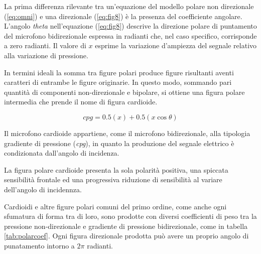 La prima differenza rilevante tra un'equazione del modello polare non
direzionale (\ref{eq:omni}) e una direzionale (\ref{eq:fig8}) è la
presenza del coefficiente angolare. L'angolo \emph{theta} nell'equazione
(\ref{eq:fig8}) descrive la direzione polare di puntamento del microfono bidirezionale
espressa in radianti che, nel caso specifico, corrisponde a zero radianti. Il valore di
$x$ esprime la variazione d'ampiezza del segnale relativo alla variazione di pressione.

In termini ideali la somma tra figure polari produce figure risultanti aventi caratteri
di entrambe le figure originarie. In questo modo, sommando pari quantità di componenti
non-direzionale e bipolare, si ottiene una figura polare intermedia che prende il
nome di figura cardioide.

\begin{equation}
cpg = 0.5(x) + 0.5(x\cos\theta)
\label{eq:cardioid}
\end{equation}

Il microfono cardioide appartiene, come il microfono bidirezionale, alla tipologia
gradiente di pressione (\emph{cpg}), in quanto la produzione del segnale elettrico è condizionata
dall'angolo di incidenza.

La figura polare cardioide presenta la sola polarità positiva, una spiccata
sensibilità frontale ed una progressiva riduzione di sensibilità al variare dell'angolo
di incidennza.

Cardioidi e altre figure polari comuni del primo ordine, come anche ogni
sfumatura di forma tra di loro, sono prodotte con diversi coefficienti di peso
tra la pressione non-direzionale e gradiente di pressione bidirezionale,
come in tabella \ref{tab:polarcoef}. Ogni figura direzionale prodotta può avere
un proprio angolo di punatamento intorno a $2\pi$ radianti.

